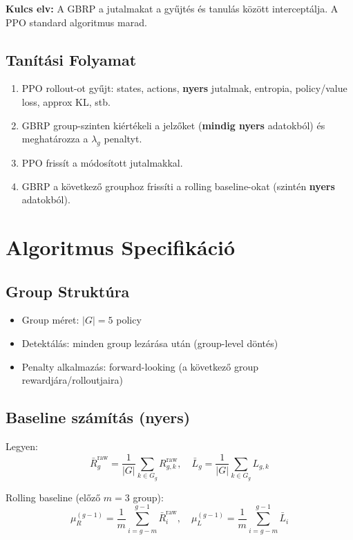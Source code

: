 \documentclass{article}
\begin{document}
\textbf{Kulcs elv:} A GBRP a jutalmakat a gyűjtés és tanulás között interceptálja. A PPO standard algoritmus marad.

\subsection{Tanítási Folyamat}
\begin{enumerate}
    \item PPO rollout-ot gyűjt: states, actions, \textbf{nyers} jutalmak, entropia, policy/value loss, approx KL, stb.
    \item GBRP group-szinten kiértékeli a jelzőket (\textbf{mindig nyers} adatokból) és meghatározza a $\lambda_g$ penaltyt.
    \item PPO frissít a módosított jutalmakkal.
    \item GBRP a következő grouphoz frissíti a rolling baseline-okat (szintén \textbf{nyers} adatokból).
\end{enumerate}

\section{Algoritmus Specifikáció}

\subsection{Group Struktúra}
\begin{itemize}
    \item Group méret: $|G| = 5$ policy
    \item Detektálás: minden group lezárása után (group-level döntés)
    \item Penalty alkalmazás: forward-looking (a következő group rewardjára/rolloutjaira)
\end{itemize}

\subsection{Baseline számítás (nyers)}
Legyen:
\begin{equation}
\bar{R}_g^{\text{raw}} = \frac{1}{|G|}\sum_{k\in G_g} R_{g,k}^{\text{raw}},
\quad
\bar{L}_g = \frac{1}{|G|}\sum_{k\in G_g} L_{g,k}
\end{equation}

Rolling baseline (előző $m=3$ group):
\begin{equation}
\mu_R^{(g-1)} = \frac{1}{m}\sum_{i=g-m}^{g-1}\bar{R}_i^{\text{raw}},
\quad
\mu_L^{(g-1)} = \frac{1}{m}\sum_{i=g-m}^{g-1}\bar{L}_i
\end{equation}
\end{document}
